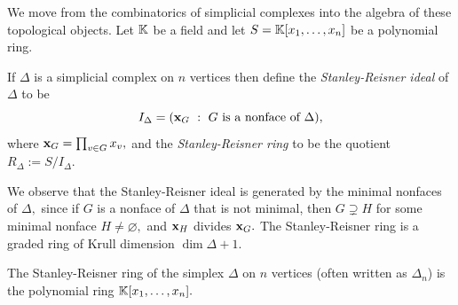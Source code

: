 We move from the combinatorics of simplicial complexes into the algebra of these topological objects. Let $\mathbb{K}$ be a field and let $S = \mathbb{K}[x_1,\ldots,x_n]$ be a polynomial ring. 
\begin{definition}
\label{def: SR ideal}
If $\Delta$ is a simplicial complex on $n$ vertices then define the \emph{Stanley-Reisner ideal} of $\Delta$ to be
\[
I_\Delta = (\mathbf{x}_G~:~G\text{ is a nonface of }\Delta),
\]
where $\mathbf{x}_G = \prod_{v\in G}x_v,$ and the \emph{Stanley-Reisner ring} to be the quotient $R_\Delta := S/I_\Delta.$
\end{definition}
We observe that the Stanley-Reisner ideal is generated by the minimal nonfaces of $\Delta,$ since if $G$ is a nonface of $\Delta$ that is not minimal, then $G\supsetneq H$ for some minimal nonface $H\neq\varnothing,$ and $\mathbf{x}_H$ divides $\mathbf{x}_G.$
The Stanley-Reisner ring is a graded ring of Krull dimension $\dim\Delta + 1.$ 
\begin{example}
\label{ex: Stanley-Reisner ring - simplex}
    The Stanley-Reisner ring of the simplex $\Delta$ on $n$ vertices (often written as $\Delta_n$) is the polynomial ring $\mathbb{K}[x_1,\ldots,x_n].$
\end{example}
 
